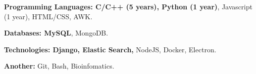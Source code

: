 
\begin{cvempty}


\begin{cvitems} %
  \item {\textbf{Programming Languages: C/C++ (5 years), Python (1 year)}, Javascript (1 year), HTML/CSS, AWK.}
  \item {\textbf{Databases: MySQL}, MongoDB.}
  \item {\textbf{Technologies: Django, Elastic Search,} NodeJS, Docker, Electron.}
  \item {\textbf{Another:} Git, Bash, Bioinfomatics.}
\end{cvitems}

\end{cvempty}
